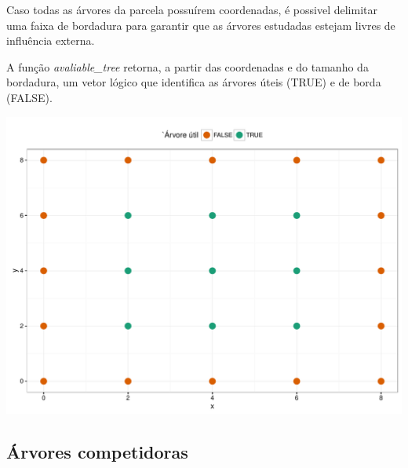 \documentclass[article]{jss}
\begin{document}
Caso todas as árvores da parcela possuírem coordenadas, é possivel
delimitar uma faixa de bordadura para garantir que as árvores estudadas
estejam livres de influência externa.

A função \emph{avaliable\_tree} retorna, a partir das coordenadas e do
tamanho da bordadura, um vetor lógico que identifica as árvores úteis
(TRUE) e de borda (FALSE).

\begin{CodeChunk}


\begin{center}\includegraphics{comp3-paper_files/figure-latex/unnamed-chunk-3-1} \end{center}

\end{CodeChunk}

\subsection{Árvores competidoras}\label{arvores-competidoras}
\end{document}
